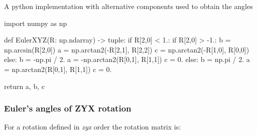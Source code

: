     A python implementation with alternative components used to obtain the angles

\begin{python}
import numpy as np

def EulerXYZ(R: np.ndarray) -> tuple:
    if R[2,0] < 1.:
        if R[2,0] > -1.:
            b = np.arcsin(R[2,0])
            a = np.arctan2(-R[2,1], R[2,2])
            c = np.arctan2(-R[1,0], R[0,0])
        else:
            b = -np.pi / 2.
            a = -np.arctan2(R[0,1], R[1,1])
            c = 0.
    else:
        b = np.pi / 2.
        a = np.arctan2(R[0,1], R[1,1])
        c = 0.

    return a, b, c
\end{python}


\subsubsection{Euler's angles of \textbf{ZYX} rotation}

    For a rotation defined in \textit{zyx} order the rotation matrix is:


